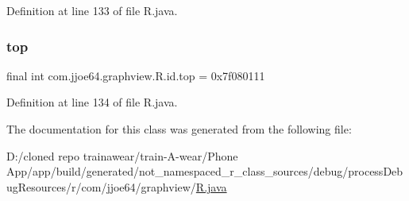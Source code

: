 Definition at line 133 of file R.\+java.

\mbox{\label{classcom_1_1jjoe64_1_1graphview_1_1_r_1_1id_ad99b3597dff3c7e3509265fbf6333241}} 
\subsubsection{\texorpdfstring{top}{top}}
{\footnotesize\ttfamily final int com.\+jjoe64.\+graphview.\+R.\+id.\+top = 0x7f080111\hspace{0.3cm}{\ttfamily [static]}}



Definition at line 134 of file R.\+java.



The documentation for this class was generated from the following file\+:\begin{DoxyCompactItemize}
\item 
D\+:/cloned repo trainawear/train-\/\+A-\/wear/\+Phone App/app/build/generated/not\+\_\+namespaced\+\_\+r\+\_\+class\+\_\+sources/debug/process\+Debug\+Resources/r/com/jjoe64/graphview/\mbox{\hyperlink{process_debug_resources_2r_2com_2jjoe64_2graphview_2_r_8java}{R.\+java}}\end{DoxyCompactItemize}
